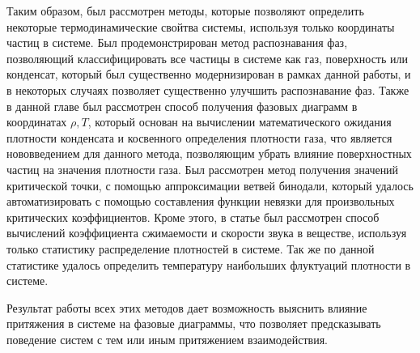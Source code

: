 Таким образом, был рассмотрен методы, которые позволяют определить некоторые термодинамические свойтва системы, используя только координаты частиц в системе. Был продемонстрирован метод распознавания фаз, позволяющий классифицировать все частицы в системе как газ, поверхность или конденсат, который был существенно модернизирован в рамках данной работы, и в некоторых случаях позволяет существенно улучшить распознавание фаз.
Также в данной главе был рассмотрен способ получения фазовых диаграмм в координатах $\rho, T$, который основан на вычислении математического ожидания плотности конденсата и косвенного определения плотности газа, что является нововведением для данного метода, позволяющим убрать влияние поверхностных частиц на значения плотности газа. 
Был рассмотрен метод получения значений критической точки, с помощью аппроксимации ветвей бинодали, который удалось автоматизировать с помощью составления функции невязки для произвольных критических коэффициентов.
Кроме этого, в статье был рассмотрен способ вычислений коэффициента сжимаемости и скорости звука в веществе, используя только статистику распределение плотностей в системе. Так же по данной статистике удалось определить температуру наибольших флуктуаций плотности в системе.

Результат работы всех этих методов дает возможность выяснить влияние притяжения в системе на фазовые диаграммы, что позволяет предсказывать поведение систем с тем или иным притяжением взаимодействия.
